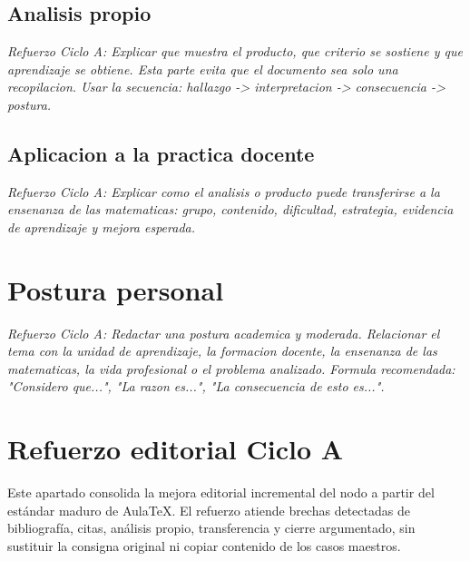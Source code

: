 \documentclass[
	spanish,
	letterpaper, oneside
]{article}
\begin{document}
\subsection{Analisis propio}

\textit{Refuerzo Ciclo A: Explicar que muestra el producto, que criterio se sostiene y que aprendizaje se obtiene. Esta parte evita que el documento sea solo una recopilacion. Usar la secuencia: hallazgo -> interpretacion -> consecuencia -> postura.}

\subsection{Aplicacion a la practica docente}

\textit{Refuerzo Ciclo A: Explicar como el analisis o producto puede transferirse a la ensenanza de las matematicas: grupo, contenido, dificultad, estrategia, evidencia de aprendizaje y mejora esperada.}

\section{Postura personal}

\textit{Refuerzo Ciclo A: Redactar una postura academica y moderada. Relacionar el tema con la unidad de aprendizaje, la formacion docente, la ensenanza de las matematicas, la vida profesional o el problema analizado. Formula recomendada: "Considero que...", "La razon es...", "La consecuencia de esto es...".}

\section*{Refuerzo editorial Ciclo A}
Este apartado consolida la mejora editorial incremental del nodo a partir del estándar maduro de AulaTeX. El refuerzo atiende brechas detectadas de bibliografía, citas, análisis propio, transferencia y cierre argumentado, sin sustituir la consigna original ni copiar contenido de los casos maestros.
\end{document}

